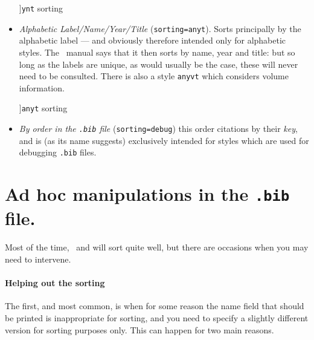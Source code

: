 \begin{itemize}
\begin{marginfigure}[1ex]
\caption[][]{\texttt{ynt} sorting}
\end{marginfigure}
\item
  \emph{Alphabetic Label/Name/Year/Title} (\texttt{sorting=anyt}). Sorts
  principally by the alphabetic label --- and obviously therefore
  intended only for alphabetic styles. The \biblatex~manual says that it
  then sorts by name, year and title: but so long as the labels are
  unique, as would usually be the case, these will never need to be
  consulted. There is also a style \texttt{anyvt} which
  considers volume information.
 \begin{marginfigure}[1ex]
\vspace{3pt}
  \caption[][]{\texttt{anyt} sorting}
  \end{marginfigure}
\item \emph{By order in the \texttt{.bib} file}
  (\texttt{sorting=debug}) this order citations by their \emph{key},
  and is (as its name suggests) exclusively intended for styles which
  are used for debugging \texttt{.bib} files.
\end{itemize}

\section{Ad hoc manipulations in the \texttt{.bib} file.}

Most of the time, \biblatex\ and  will sort quite well,
but there are occasions when you may need to intervene.

\paragraph{Helping out the sorting}\label{sorting:sortname} The first,
and most common, is when for some reason the name field that should be
printed is inappropriate for sorting, and you need to specify a
slightly different version for sorting purposes only. This can happen
for two main reasons.

